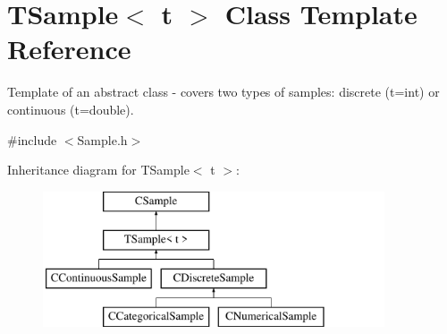 \hypertarget{class_t_sample}{\section{T\-Sample$<$ t $>$ Class Template Reference}
\label{class_t_sample}
}


Template of an abstract class -\/ covers two types of samples\-: discrete (t=int) or continuous (t=double).  




{\ttfamily \#include $<$Sample.\-h$>$}

Inheritance diagram for T\-Sample$<$ t $>$\-:\begin{figure}[H]
\begin{center}
\leavevmode
\includegraphics[height=4.000000cm]{class_t_sample}
\end{center}
\end{figure}
